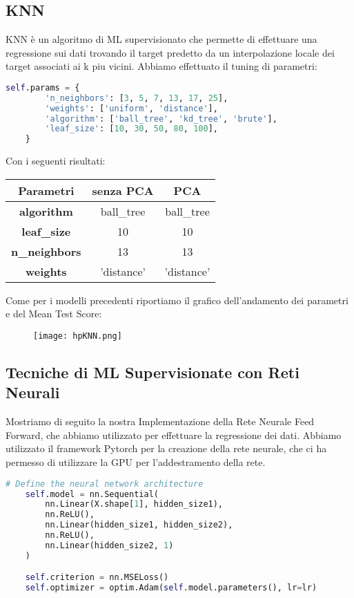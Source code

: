\documentclass[../../Report.tex]{subfiles}
\begin{document}
\subsection{KNN}
KNN è un algoritmo di ML supervisionato che permette di effettuare una regressione sui dati trovando il target predetto da un interpolazione locale dei target associati ai k piu vicini.
Abbiamo effettuato il tuning di parametri:
\begin{lstlisting}[language=Python]
    self.params = {
        'n_neighbors': [3, 5, 7, 13, 17, 25],
        'weights': ['uniform', 'distance'],
        'algorithm': ['ball_tree', 'kd_tree', 'brute'],
        'leaf_size': [10, 30, 50, 80, 100],
    }
\end{lstlisting}
Con i seguenti risultati:
\begin{table}[H]
    \centering
    \begin{tabular}{|c|c|c|}
    \hline
    \textbf{Parametri} & \textbf{senza PCA} & \textbf{PCA} \\ \hline
    \textbf{algorithm}& ball\_tree & ball\_tree\\
    \textbf{leaf\_size}& 10 &  10 \\
    \textbf{n\_neighbors}& 13 & 13\\
    \textbf{weights}& 'distance' &  'distance'\\
    \hline
\end{tabular}
\end{table}
Come per i modelli precedenti riportiamo il grafico dell'andamento dei parametri e del Mean Test Score:
\begin{figure}[H]
    \centering
    \texttt{[image: hpKNN.png]}
\end{figure}

\subsection{Tecniche di ML Supervisionate con Reti Neurali}
Mostriamo di seguito la nostra Implementazione della Rete Neurale Feed Forward, che abbiamo utilizzato per effettuare la regressione dei dati.
Abbiamo utilizzato il framework Pytorch per la creazione della rete neurale, che ci ha permesso di utilizzare la GPU per l'addestramento della rete.

\begin{lstlisting}[language=python]
    # Define the neural network architecture
    self.model = nn.Sequential(
        nn.Linear(X.shape[1], hidden_size1),
        nn.ReLU(),
        nn.Linear(hidden_size1, hidden_size2),
        nn.ReLU(),
        nn.Linear(hidden_size2, 1)
    )

    self.criterion = nn.MSELoss()
    self.optimizer = optim.Adam(self.model.parameters(), lr=lr)

\end{lstlisting}
\end{document}
